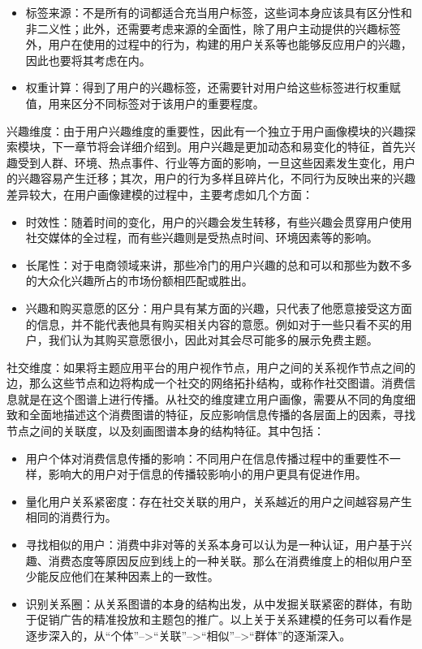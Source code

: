         \begin{itemize}
        \item 标签来源：不是所有的词都适合充当用户标签，这些词本身应该具有区分性和非二义性；此外，还需要考虑来源的全面性，除了用户主动提供的兴趣标签外，用户在使用的过程中的行为，构建的用户关系等也能够反应用户的兴趣，因此也要将其考虑在内。
        \item 权重计算：得到了用户的兴趣标签，还需要针对用户给这些标签进行权重赋值，用来区分不同标签对于该用户的重要程度。
        \end{itemize}

        兴趣维度：由于用户兴趣维度的重要性，因此有一个独立于用户画像模块的兴趣探索模块，下一章节将会详细介绍到。用户兴趣是更加动态和易变化的特征，首先兴趣受到人群、环境、热点事件、行业等方面的影响，一旦这些因素发生变化，用户的兴趣容易产生迁移；其次，用户的行为多样且碎片化，不同行为反映出来的兴趣差异较大，在用户画像建模的过程中，主要考虑如几个方面：
        \begin{itemize}
        \item 时效性：随着时间的变化，用户的兴趣会发生转移，有些兴趣会贯穿用户使用社交媒体的全过程，而有些兴趣则是受热点时间、环境因素等的影响。
        \item 长尾性：对于电商领域来讲，那些冷门的用户兴趣的总和可以和那些为数不多的大众化兴趣所占的市场份额相匹配或胜出。
        \item 兴趣和购买意愿的区分：用户具有某方面的兴趣，只代表了他愿意接受这方面的信息，并不能代表他具有购买相关内容的意愿。例如对于一些只看不买的用户，我们认为其购买意愿很小，因此对其会尽可能多的展示免费主题。
        \end{itemize}

        社交维度：如果将主题应用平台的用户视作节点，用户之间的关系视作节点之间的边，那么这些节点和边将构成一个社交的网络拓扑结构，或称作社交图谱。消费信息就是在这个图谱上进行传播。从社交的维度建立用户画像，需要从不同的角度细致和全面地描述这个消费图谱的特征，反应影响信息传播的各层面上的因素，寻找节点之间的关联度，以及刻画图谱本身的结构特征。其中包括：
        \begin{itemize}
        \item 用户个体对消费信息传播的影响：不同用户在信息传播过程中的重要性不一样，影响大的用户对于信息的传播较影响小的用户更具有促进作用。
        \item 量化用户关系紧密度：存在社交关联的用户，关系越近的用户之间越容易产生相同的消费行为。
        \item 寻找相似的用户：消费中非对等的关系本身可以认为是一种认证，用户基于兴趣、消费态度等原因反应到线上的一种关联。那么在消费维度上的相似用户至少能反应他们在某种因素上的一致性。
        \item 识别关系圈：从关系图谱的本身的结构出发，从中发掘关联紧密的群体，有助于促销广告的精准投放和主题包的推广。以上关于关系建模的任务可以看作是逐步深入的，从“个体”-->“关联”-->“相似”-->“群体”的逐渐深入。
        \end{itemize}

